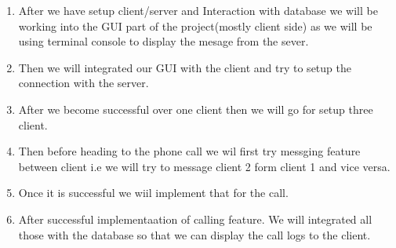 \documentclass[a4paper]{article}
\begin{document}
{{{\begin{enumerate}
				\item After we have setup client/server and Interaction with database we will be working into the GUI part of the project(mostly client side)  as we will be using terminal console to display the mesage from the sever.


				\item Then we will integrated our GUI with the client and try to setup the connection with the server.

				\item After we become successful over one client then we will go for setup three client.

				\item Then before heading to the phone call we wil first try messging feature between client i.e we will try to message client 2 form client 1 and vice versa.

				\item Once it is successful we wiil implement that for the call.

				\item After successful implementaation of calling feature. We will integrated all those with the database so that we can display the call logs to the client.
			\end{enumerate}
		}

	}
}

\end{document}
